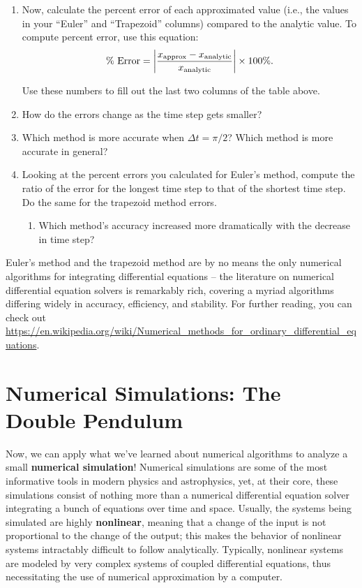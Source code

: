 \documentclass[11pt]{article}
\begin{document}
\begin{enumerate}[resume]
    \item Now, calculate the percent error of each approximated value (i.e., the values in your ``Euler'' and ``Trapezoid'' columns) compared to the analytic value. To compute percent error, use this equation:
    \begin{equation} \label{eq:error}
    \text{\% Error} = \left|\frac{x_{\rm approx} - x_{\rm analytic}}{x_{\rm analytic}}\right| \times 100\%.
    \end{equation}
    
    Use these numbers to fill out the last two columns of the table above.
    \item How do the errors change as the time step gets smaller?
    \item Which method is more accurate when $\Delta t = \pi/2$? Which method is more accurate in general?
    \item Looking at the percent errors you calculated for Euler's method, compute the ratio of the error for the longest time step to that of the shortest time step. Do the same for the trapezoid method errors. 
    \begin{enumerate}
        \item Which method's accuracy increased more dramatically with the decrease in time step?
    \end{enumerate}
\end{enumerate}

\noindent
Euler's method and the trapezoid method are by no means the only numerical algorithms for integrating differential equations -- the literature on numerical differential equation solvers is remarkably rich, covering a myriad  algorithms differing widely in accuracy, efficiency, and stability. For further reading, you can check out \url{https://en.wikipedia.org/wiki/Numerical_methods_for_ordinary_differential_equations}.

\section{Numerical Simulations: The Double Pendulum}

Now, we can apply what we've learned about numerical algorithms to analyze a small \textbf{numerical simulation}! Numerical simulations are some of the most informative tools in modern physics and astrophysics, yet, at their core, these simulations consist of nothing more than a numerical differential equation solver integrating a bunch of equations over time and space. Usually, the systems being simulated are highly \textbf{nonlinear}, meaning that a change of the input is not proportional to the change of the output; this makes the behavior of nonlinear systems intractably difficult to follow analytically. Typically, nonlinear systems are modeled by very complex systems of coupled differential equations, thus necessitating the use of numerical approximation by a computer. \vspace{\baselineskip}
\end{document}
